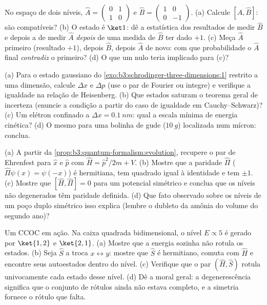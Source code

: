 \begin{exercise}[$\star\star$]\label{exo:b3:quantum-formalism:6}
No espaço de dois níveis, $\hat A = \begin{pmatrix}0&1\\1&0
\end{pmatrix}$ e $\hat B = \begin{pmatrix}1&0\\0&-1\end{pmatrix}$.
(a) Calcule $[\hat A, \hat B]$: são compatíveis? (b) O estado é
$\ket1$: dê a estatística dos resultados de medir $\hat B$ e depois a
de medir $\hat A$ \emph{depois} de uma medida de $\hat B$ ter dado
$+1$. (c) Meça $\hat A$ primeiro (resultado $+1$), depois $\hat B$,
depois $\hat A$ de novo: com que probabilidade o $\hat A$ final
\emph{contradiz} o primeiro? (d) O que um  nulo teria
implicado para (c)?
\end{exercise}

\begin{exercise}[$\star\star$]\label{exo:b3:quantum-formalism:7}
(a) Para o estado gaussiano do
\cref{exo:b3:schrodinger-three-dimensions:1} restrito a uma dimensão,
calcule $\Delta x$ e $\Delta p$ (use o par de Fourier ou integre) e
verifique a igualdade na relação de Heisenberg. (b) Que estados saturam
o teorema geral de incerteza (enuncie a condição a partir do caso de
igualdade em Cauchy--Schwarz)? (c) Um elétron confinado a
$\Delta x = \qty{0.1}{nm}$: qual a escala mínima de energia cinética?
(d) O mesmo para uma bolinha de gude ($\qty{10}{g}$) localizada num
mícron: conclua.
\end{exercise}

\begin{exercise}[$\star\star$]\label{exo:b3:quantum-formalism:8}
(a) A partir da \cref{prop:b3:quantum-formalism:evolution}, recupere o
par de Ehrenfest para $\hat x$ e $\hat p$ com $\hat H = \hat
p^2/2m + V$. (b) Mostre que a paridade $\hat\Pi$ ($\hat\Pi\psi(x) =
\psi(-x)$) é hermitiana, tem quadrado igual à identidade e tem
 $\pm1$. (c) Mostre que $[\hat H, \hat\Pi] = 0$ para um
potencial simétrico e conclua que os níveis não degenerados têm
paridade definida. (d) Que fato observado sobre os níveis de um poço
duplo simétrico isso explica (lembre o dubleto da amônia do volume do
segundo ano)?
\end{exercise}

\begin{exercise}[$\star\star$]\label{exo:b3:quantum-formalism:9}
Um CCOC em ação. Na caixa quadrada bidimensional, o nível $E
\propto 5$ é gerado por $\ket{1,2}$ e $\ket{2,1}$. (a) Mostre que a
energia sozinha não rotula os estados. (b) Seja $\hat S$ a troca $x
\leftrightarrow y$: mostre que $\hat S$ é hermitiano, comuta com $\hat
H$ e encontre seus autoestados dentro do nível. (c) Verifique que o par $(\hat H, \hat S)$ rotula
univocamente cada estado desse nível. (d) Dê a moral geral: a
degenerescência significa que o conjunto de rótulos ainda não estava
completo, e a simetria fornece o rótulo que falta.
\end{exercise}


